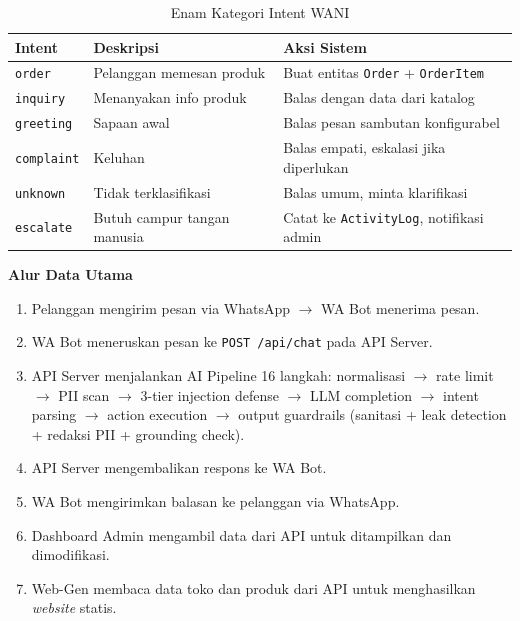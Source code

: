 \documentclass[12pt,a4paper,oneside]{article}
\begin{document}
\begin{table}[H]
	\centering
	\caption{Enam Kategori Intent WANI}
	\label{tab:intent}
	\begin{tabularx}{\textwidth}{p{2.5cm}Xp{5cm}}
		\toprule
		\textbf{Intent}    & \textbf{Deskripsi}          & \textbf{Aksi Sistem}                             \\
		\midrule
		\texttt{order}     & Pelanggan memesan produk    & Buat entitas \texttt{Order} + \texttt{OrderItem} \\
		\texttt{inquiry}   & Menanyakan info produk      & Balas dengan data dari katalog                   \\
		\texttt{greeting}  & Sapaan awal                 & Balas pesan sambutan konfigurabel                \\
		\texttt{complaint} & Keluhan                     & Balas empati, eskalasi jika diperlukan           \\
		\texttt{unknown}   & Tidak terklasifikasi        & Balas umum, minta klarifikasi                    \\
		\texttt{escalate}  & Butuh campur tangan manusia & Catat ke \texttt{ActivityLog}, notifikasi admin  \\
		\bottomrule
	\end{tabularx}
\end{table}

\textbf{Alur Data Utama}

\begin{enumerate}
	\item Pelanggan mengirim pesan via WhatsApp $\rightarrow$ WA Bot menerima pesan.
	\item WA Bot meneruskan pesan ke \texttt{POST /api/chat} pada API Server.
	\item API Server menjalankan AI Pipeline 16 langkah: normalisasi $\rightarrow$ rate limit $\rightarrow$ PII scan $\rightarrow$ 3-tier injection defense $\rightarrow$ LLM completion $\rightarrow$ intent parsing $\rightarrow$ action execution $\rightarrow$ output guardrails (sanitasi + leak detection + redaksi PII + grounding check).
	\item API Server mengembalikan respons ke WA Bot.
	\item WA Bot mengirimkan balasan ke pelanggan via WhatsApp.
	\item Dashboard Admin mengambil data dari API untuk ditampilkan dan dimodifikasi.
	\item Web-Gen membaca data toko dan produk dari API untuk menghasilkan \textit{website} statis.
\end{enumerate}
\end{document}
